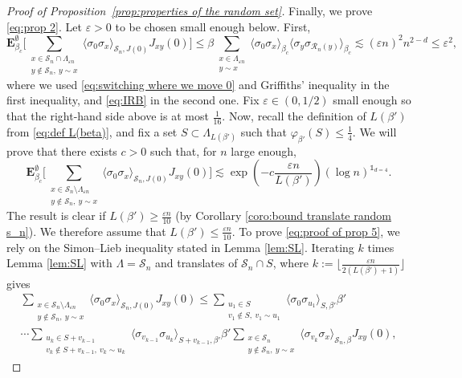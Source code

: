 \documentclass[11pt,a4paper]{article}
\numberwithin{equation}{section}
\theoremstyle{plain}
\theoremstyle{definition}
\begin{document}
\begin{proof}[Proof of Proposition~\textup{\ref{prop:properties of the random set}}]
	Finally, we prove \eqref{eq:prop 2}. Let $\varepsilon>0$ to be chosen small enough below. First, 
	\begin{equation}\label{eq:proof of prop 4}
		\mathbf E_{\beta_c}^\emptyset\Big[\sum_{\substack{x\in \mathcal S_n\cap \Lambda_{\varepsilon n}\\y\notin \mathcal S_n, \: y\sim x}}\langle \sigma_0\sigma_x\rangle_{\mathcal S_n,J(0)}J_{xy}(0)\Big]\leq  \beta\sum_{\substack{x\in \Lambda_{\varepsilon n}\\y\sim x}}\langle \sigma_0\sigma_x\rangle_{\beta_c}\langle \sigma_y\sigma_{\mathcal R_n(y)}\rangle_{\beta_c}\lesssim (\varepsilon n)^2 n^{2-d}\leq \varepsilon^2 ,
	\end{equation}
		where we used \eqref{eq:switching where we move 0} and Griffiths' inequality in the first inequality, and \eqref{eq:IRB} in the second one. Fix $\varepsilon\in (0,1/2)$ small enough so that the right-hand side above is at most $\tfrac{1}{16}$. Now, recall the definition of $L(\beta')$ from \eqref{eq:def L(beta)}, and fix a set $S\subset \Lambda_{L(\beta')}$ such that $\varphi_{\beta'}(S)\leq \frac{1}{4}$. We will prove that there exists $c>0$ such that, for $n$ large enough, 
	\begin{equation}\label{eq:proof of prop 5}
		\mathbf E_{\beta_c}^\emptyset\Big[\sum_{\substack{x\in \mathcal S_n\setminus\Lambda_{\varepsilon n}\\y\notin \mathcal S_n, \: y\sim x}}\langle \sigma_0\sigma_x\rangle_{\mathcal S_n,J(0)}J_{xy}(0)\Big]\lesssim \exp\left(-c\frac{\varepsilon n}{L(\beta')}\right)(\log n)^{\mathds{1}_{d=4}}.
	\end{equation}
		The result is clear if $L(\beta')\geq \tfrac{\varepsilon n}{10}$ (by Corollary \ref{coro:bound translate random s_n}). We therefore assume that $L(\beta')\leq \tfrac{\varepsilon n}{10}$. To prove \eqref{eq:proof of prop 5}, we rely on the Simon--Lieb inequality stated in Lemma \ref{lem:SL}. Iterating $k$ times Lemma \ref{lem:SL} with $\Lambda=\mathcal S_n$ and translates of $\mathcal S_n\cap S$, where $k:=\lfloor\tfrac{\varepsilon n}{2(L(\beta')+1)} \rfloor$ gives
	\begin{multline}
		\sum_{\substack{x\in \mathcal S_n\setminus\Lambda_{\varepsilon n}\\y\notin \mathcal S_n, \: y\sim x}}\langle \sigma_0\sigma_x\rangle_{\mathcal S_n,J(0)}J_{xy}(0)\leq \sum_{\substack{u_1\in S\\v_1\notin S, \: v_1\sim u_1}}\langle \sigma_0\sigma_{u_1}\rangle_{S,\beta'} \beta' \\\cdots \sum_{\substack{u_k\in S+v_{k-1}\\v_k\notin S+v_{k-1},\: v_k\sim u_k}}\langle \sigma_{v_{k-1}}\sigma_{u_k}\rangle_{S+v_{k-1},\beta'}\beta' \sum_{\substack{x\in \mathcal S_n\\y\notin \mathcal S_n, \: y\sim x}}\langle \sigma_{v_k}\sigma_x\rangle_{\mathcal S_n,\beta}J_{xy}(0),

\end{multline}
\end{proof}
\end{document}
